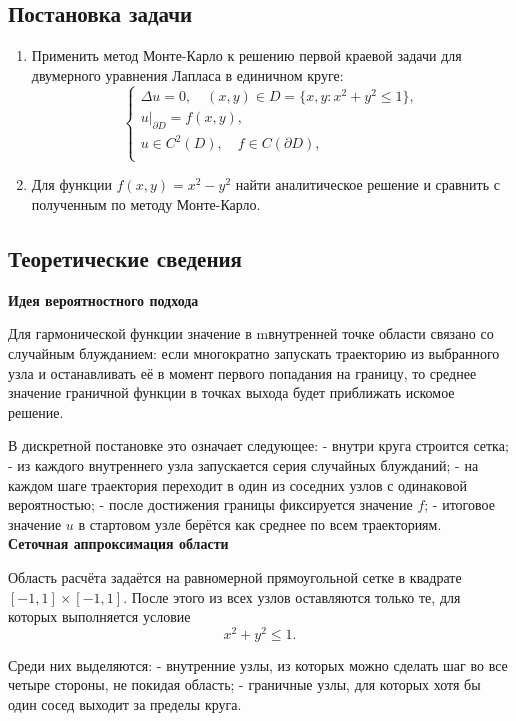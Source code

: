 \documentclass[11pt]{article}
\renewcommand{\le}{\leqslant}
\begin{document}
\subsection{Постановка задачи}
\begin{enumerate}
    \item Применить метод Монте-Карло к решению первой краевой задачи для двумерного уравнения Лапласа в единичном круге:
$$
\begin{cases}
    \Delta u = 0, \quad (x,y) \in D = \{x, y: x^2+y^2 \leq 1\}, \\
    u|_{\partial D} = f(x, y), \\
    u\in C^2(D), \quad f\in C(\partial D), \\
\end{cases}
$$
    \item Для функции $f(x, y) = x^2-y^2$ найти аналитическое решение и сравнить с полученным по методу Монте-Карло.
\end{enumerate}
\subsection{Теоретические сведения}

\textbf{Идея вероятностного подхода}

Для гармонической функции значение в  mвнутренней точке области связано со случайным блужданием: если многократно запускать траекторию из выбранного узла и останавливать её в момент первого попадания на границу, то среднее значение граничной функции в точках выхода будет приближать искомое решение.

В дискретной постановке это означает следующее:
- внутри круга строится сетка;
- из каждого внутреннего узла запускается серия случайных блужданий;
- на каждом шаге траектория переходит в один из соседних узлов с одинаковой вероятностью;
- после достижения границы фиксируется значение $f$;
- итоговое значение $u$ в стартовом узле берётся как среднее по всем траекториям.
\\
\textbf{Сеточная аппроксимация области}

Область расчёта задаётся на равномерной прямоугольной сетке в квадрате $[-1,1]\times[-1,1]$. После этого из всех узлов оставляются только те, для которых выполняется условие
$$
x^2+y^2\le 1.
$$

Среди них выделяются:
- внутренние узлы, из которых можно сделать шаг во все четыре стороны, не покидая область;
- граничные узлы, для которых хотя бы один сосед выходит за пределы круга.
\end{document}
